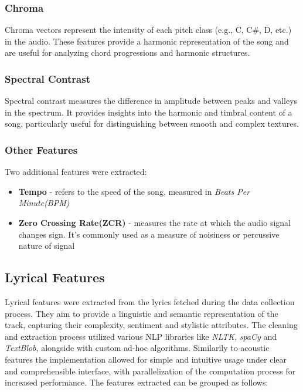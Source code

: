 \subsubsection*{Chroma}
Chroma vectors represent the intensity of each pitch class (e.g., C, C\#, D,
etc.) in the audio. These features provide a harmonic representation of the
song and are useful for analyzing chord progressions and harmonic structures.

\subsubsection*{Spectral Contrast}
Spectral contrast measures the difference in amplitude between peaks and
valleys in the spectrum. It provides insights into the harmonic and timbral
content of a song, particularly useful for distinguishing between smooth and
complex textures.

\subsubsection*{Other Features}
Two additional features were extracted:
\begin{itemize}
  \item \textbf{Tempo} - refers to the speed of the song, measured in
    \textit{Beats Per Minute(BPM)}
  \item \textbf{Zero Crossing Rate(ZCR)} - measures the rate at which the audio
    signal changes sign. It's commonly used as a measure of noisiness or
    percussive nature of signal
\end{itemize}


\subsection{Lyrical Features}
\label{sec:lyricalfeatures}

Lyrical features  were extracted from the lyrics fetched during the data
collection process. They aim to provide a linguistic and semantic
representation of the track, capturing their complexity, sentiment and
stylistic  attributes. The cleaning and extraction  process utilized various
NLP libraries like \textit{NLTK}\cite{nltk}, \textit{spaCy}\cite{spacy} and
\textit{TextBlob}\cite{textblob}, alongside with custom ad-hoc algorithms.
Similarily to acoustic features the implementation allowed for simple and
intuitive usage under clear and comprehensible interface, with parallelization
of the computation process for increased performance. The features extracted
can be grouped as follows:

